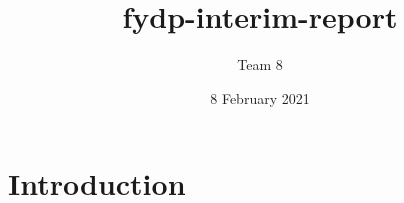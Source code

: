 \documentclass{article}
\title{fydp-interim-report}
\author{Team 8}
\date{8 February 2021}
\begin{document}
\maketitle

\section{Introduction}
\end{document}
